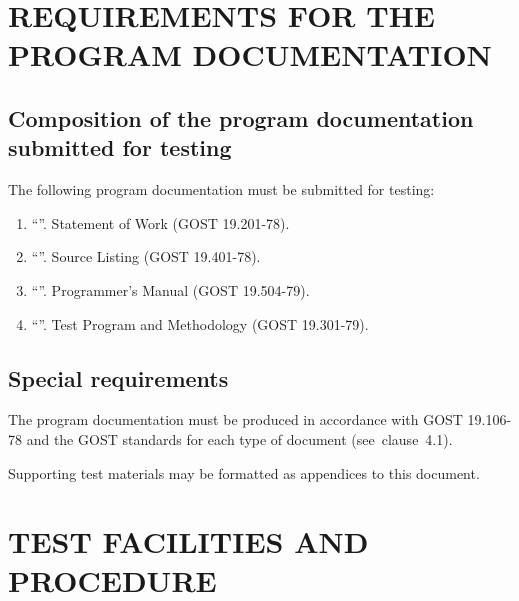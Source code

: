 \documentclass[12pt,a4paper]{extarticle}
\begin{document}
\section{REQUIREMENTS FOR THE PROGRAM DOCUMENTATION}

\subsection{Composition of the program documentation submitted for testing}


The following program documentation must be submitted for testing:
\begin{enumerate}[label=\arabic*), leftmargin=1.25cm]
    \item \enquote{\projectname}. Statement of Work (GOST 19.201-78).
    \item \enquote{\projectname}. Source Listing (GOST 19.401-78).
    \item \enquote{\projectname}. Programmer's Manual (GOST 19.504-79).
    \item \enquote{\projectname}. Test Program and Methodology
          (GOST 19.301-79).
\end{enumerate}

\subsection{Special requirements}

The program documentation must be produced in accordance with GOST 19.106-78\cite{gost19106} and the GOST standards for each type of document (see~clause~4.1).

Supporting test materials may be formatted as appendices to this document.

\clearpage

\section{TEST FACILITIES AND PROCEDURE}
\end{document}
